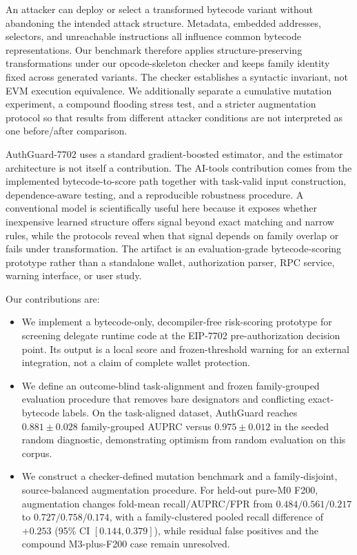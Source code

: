 An attacker can deploy or select a transformed bytecode variant without abandoning the intended attack structure. Metadata, embedded addresses, selectors, and unreachable instructions all influence common bytecode representations. Our benchmark therefore applies structure-preserving transformations under our opcode-skeleton checker and keeps family identity fixed across generated variants. The checker establishes a syntactic invariant, not EVM execution equivalence. We additionally separate a cumulative mutation experiment, a compound flooding stress test, and a stricter augmentation protocol so that results from different attacker conditions are not interpreted as one before/after comparison.

AuthGuard-7702 uses a standard gradient-boosted estimator, and the estimator architecture is not itself a contribution. The AI-tools contribution comes from the implemented bytecode-to-score path together with task-valid input construction, dependence-aware testing, and a reproducible robustness procedure. A conventional model is scientifically useful here because it exposes whether inexpensive learned structure offers signal beyond exact matching and narrow rules, while the protocols reveal when that signal depends on family overlap or fails under transformation. The artifact is an evaluation-grade bytecode-scoring prototype rather than a standalone wallet, authorization parser, RPC service, warning interface, or user study.

Our contributions are:
\begin{itemize}
  \item We implement a bytecode-only, decompiler-free risk-scoring prototype for screening delegate runtime code at the EIP-7702 pre-authorization decision point. Its output is a local score and frozen-threshold warning for an external integration, not a claim of complete wallet protection.
  \item We define an outcome-blind task-alignment and frozen family-grouped evaluation procedure that removes bare designators and conflicting exact-bytecode labels. On the task-aligned dataset, AuthGuard reaches $0.881\pm0.028$ family-grouped AUPRC versus $0.975\pm0.012$ in the seeded random diagnostic, demonstrating optimism from random evaluation on this corpus.
  \item We construct a checker-defined mutation benchmark and a family-disjoint, source-balanced augmentation procedure. For held-out pure-M0 F200, augmentation changes fold-mean recall/AUPRC/FPR from $0.484/0.561/0.217$ to $0.727/0.758/0.174$, with a family-clustered pooled recall difference of $+0.253$ (95\% CI $[0.144,0.379]$), while residual false positives and the compound M3-plus-F200 case remain unresolved.
\end{itemize}
